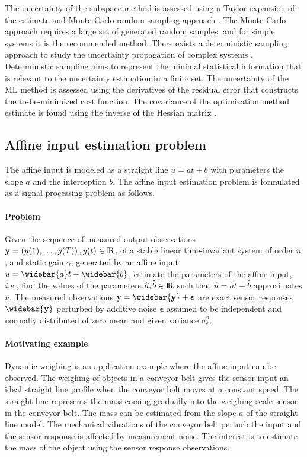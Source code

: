The uncertainty of the subspace method is assessed using a Taylor expansion of the estimate and Monte Carlo random sampling approach \cite{Quintana19}.
The Monte Carlo approach requires a large set of generated random samples, and for simple systems it is the recommended method.
There exists a deterministic sampling approach to study the uncertainty propagation of complex systems \cite{Hessling13a, Hessling13b}. 
Deterministic sampling aims to represent the minimal statistical information that is relevant to the uncertainty estimation in a finite set.
The uncertainty of the ML method is assessed using the derivatives of the residual error that constructs the to-be-minimized cost function.
The covariance of the optimization method estimate is found using the inverse of the Hessian matrix \cite{Pintelon12Book}.





\subsection{Affine input estimation problem}

The affine input is modeled as a straight line $u = {a} t + {b}$ with parameters the slope $a$ and the interception $b$.
The affine input estimation problem is formulated as a signal processing problem as follows. 


\paragraph{Problem} 
Given the sequence of measured output observations $\mathbf{y} = \left( y(1),\ldots,y(T)\right), y(t) \in {\rm I\!R}$, of a stable linear time-invariant system of order $n$, and static gain $\gamma$, generated by an affine input $u = \widebar{a} t + \widebar{b}$, estimate the parameters of the affine input, \textit{i.e.,} find the values of the parameters $\widehat{a}, \widehat{b} \in {\rm I\!R}$ such that $\widehat{u} = \widehat{a} t + \widehat{b}$ approximates $u$.
The measured observations $\mathbf{y} = \widebar{\mathbf{y}} + \bm{\epsilon}$ are exact sensor responses $\widebar{\mathbf{y}}$ perturbed by additive noise  $\bm{\epsilon}$ assumed to be independent and normally distributed of zero mean and given variance $\sigma_{\epsilon}^2$.

\paragraph{Motivating example}
Dynamic weighing is an application example where the affine input can be observed.
The weighing of objects in a conveyor belt gives the sensor input an ideal straight line profile when the conveyor belt moves at a constant speed.
The straight line represents the mass coming gradually into the weighing scale sensor in the conveyor belt.
The mass can be estimated from the slope $a$ of the straight line model. 
The mechanical vibrations of the conveyor belt perturb the input and the sensor response is affected by measurement noise.
The interest is to estimate the mass of the object using the sensor response observations.

